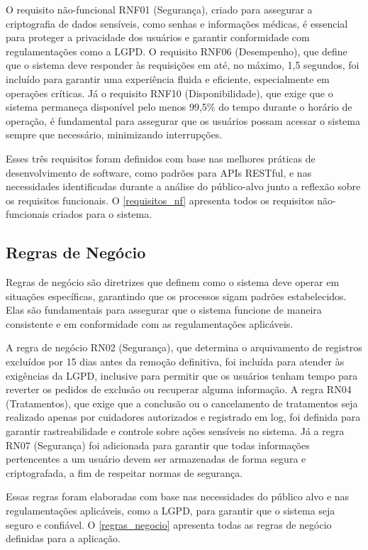 \documentclass[
	article,			%
	12pt,				%
	oneside,			%
	a4paper,			%
    BIBLATEX,           %
	english,			%
	brazil,				%
	sumario=tradicional
	]{abntex2}
\begin{document}
O requisito não-funcional RNF01 (Segurança), criado para assegurar a criptografia de dados sensíveis, como senhas e informações médicas, é essencial para proteger a privacidade dos usuários e garantir conformidade com regulamentações como a LGPD. O requisito RNF06 (Desempenho), que define que o sistema deve responder às requisições em até, no máximo, 1,5 segundos, foi incluído para garantir uma experiência fluida e eficiente, especialmente em operações críticas. Já o requisito RNF10 (Disponibilidade), que exige que o sistema permaneça disponível pelo menos 99,5\% do tempo durante o horário de operação, é fundamental para assegurar que os usuários possam acessar o sistema sempre que necessário, minimizando interrupções.

Esses três requisitos foram definidos com base nas melhores práticas de desenvolvimento de software, como padrões para APIs RESTful, e nas necessidades identificadas durante a análise do público-alvo junto a reflexão sobre os requisitos funcionais. O \autoref{requisitos_nf} apresenta todos os requisitos não-funcionais criados para o sistema.

\subsection{Regras de Negócio}

Regras de negócio são diretrizes que definem como o sistema deve operar em situações específicas, garantindo que os processos sigam padrões estabelecidos. Elas são fundamentais para assegurar que o sistema funcione de maneira consistente e em conformidade com as regulamentações aplicáveis.

A regra de negócio RN02 (Segurança), que determina o arquivamento de registros excluídos por 15 dias antes da remoção definitiva, foi incluída para atender às exigências da LGPD, inclusive para permitir que os usuários tenham tempo para reverter os pedidos de exclusão ou recuperar alguma informação. A regra RN04 (Tratamentos), que exige que a conclusão ou o cancelamento de tratamentos seja realizado apenas por cuidadores autorizados e registrado em log, foi definida para garantir rastreabilidade e controle sobre ações sensíveis no sistema. Já a regra RN07 (Segurança) foi adicionada para garantir que todas informações pertencentes a um usuário devem ser armazenadas de forma segura e criptografada, a fim de respeitar normas de segurança.

Essas regras foram elaboradas com base nas necessidades do público alvo e nas regulamentações aplicáveis, como a LGPD, para garantir que o sistema seja seguro e confiável. O \autoref{regras_negocio} apresenta todas as regras de negócio definidas para a aplicação.
\end{document}
